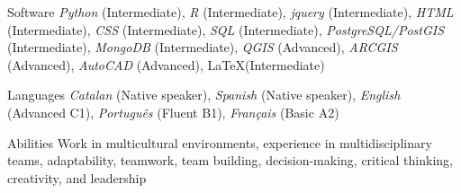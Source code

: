 

\begin{cvskills}

  \cvskill
    {Software} %
    {\emph{Python} (Intermediate), \emph{R} (Intermediate), \emph{jquery} (Intermediate), \emph{HTML} (Intermediate), \emph{CSS} (Intermediate), \emph{SQL} (Intermediate), \emph{PostgreSQL/PostGIS} (Intermediate), \emph{MongoDB} (Intermediate), \emph{QGIS} (Advanced), \emph{ARCGIS} (Advanced), \emph{AutoCAD} (Advanced), \LaTeX (Intermediate)} %
    
  \cvskill
    {Languages} %
    {\emph{Catalan} (Native speaker), \emph{Spanish} (Native speaker), \emph{English} (Advanced C1), \emph{Português} (Fluent B1), \emph{Français} (Basic A2) } %
    
  \cvskill
    {Abilities} %
    {Work in multicultural environments, experience in multidisciplinary teams, adaptability, teamwork, team building, decision-making, critical thinking, creativity, and leadership} %
    
\end{cvskills}
